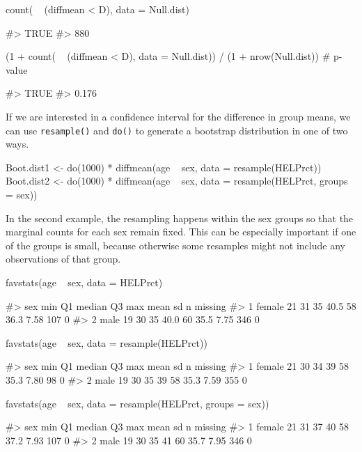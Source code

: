 \begin{Schunk}
\begin{Sinput}
count( ~ (diffmean < D), data = Null.dist)
\end{Sinput}
\begin{Soutput}
#> TRUE 
#>  880
\end{Soutput}
\begin{Sinput}
(1 + count( ~ (diffmean < D), data = Null.dist)) / (1 + nrow(Null.dist))  # p-value
\end{Sinput}
\begin{Soutput}
#>  TRUE 
#> 0.176
\end{Soutput}
\end{Schunk}

If we are interested in a confidence interval for the difference in
group means, we can use \texttt{resample()} and \texttt{do()} to
generate a bootstrap distribution in one of two ways.

\begin{Schunk}
\begin{Sinput}
Boot.dist1 <- do(1000) * diffmean(age ~ sex, data = resample(HELPrct))
Boot.dist2 <- do(1000) * diffmean(age ~ sex, data = resample(HELPrct, groups = sex))
\end{Sinput}
\end{Schunk}

\noindent
In the second example, the resampling happens within the sex groups so
that the marginal counts for each sex remain fixed. This can be
especially important if one of the groups is small, because otherwise
some resamples might not include any observations of that group.

\begin{Schunk}
\begin{Sinput}
favstats(age ~ sex, data = HELPrct)
\end{Sinput}
\begin{Soutput}
#>      sex min Q1 median   Q3 max mean   sd   n missing
#> 1 female  21 31     35 40.5  58 36.3 7.58 107       0
#> 2   male  19 30     35 40.0  60 35.5 7.75 346       0
\end{Soutput}
\begin{Sinput}
favstats(age ~ sex, data = resample(HELPrct))
\end{Sinput}
\begin{Soutput}
#>      sex min Q1 median Q3 max mean   sd   n missing
#> 1 female  21 30     34 39  58 35.3 7.80  98       0
#> 2   male  19 30     35 39  58 35.3 7.59 355       0
\end{Soutput}
\begin{Sinput}
favstats(age ~ sex, data = resample(HELPrct, groups = sex))
\end{Sinput}
\begin{Soutput}
#>      sex min Q1 median Q3 max mean   sd   n missing
#> 1 female  21 31     37 40  58 37.2 7.93 107       0
#> 2   male  19 30     35 41  60 35.7 7.95 346       0
\end{Soutput}
\end{Schunk}

